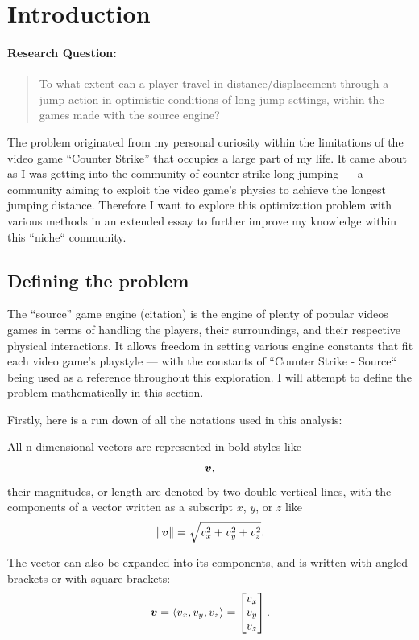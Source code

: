 \section{Introduction}

\paragraph{Research Question:}
\begin{quote}
    To what extent can a player travel in distance/displacement through a jump action in optimistic conditions of long-jump settings, within the games made with the source engine?
\end{quote}

The problem originated from my personal curiosity within the limitations of the video game ``Counter Strike'' that occupies a large part of my life. It came about as I was getting into the community of counter-strike long jumping --- a community aiming to exploit the video game's physics to achieve the longest jumping distance. Therefore I want to explore this optimization problem with various methods in an extended essay to further improve my knowledge within this ``niche`` community.

\subsection{Defining the problem}
The ``source'' game engine (citation) is the engine of plenty of popular videos games in terms of handling the players, their surroundings, and their respective physical interactions. It allows freedom in setting various engine constants that fit each video game's playstyle --- with the constants of ``Counter Strike - Source`` being used as a reference throughout this exploration. I will attempt to define the problem mathematically in this section.

Firstly, here is a run down of all the notations used in this analysis:

All n-dimensional vectors are represented in bold styles like
\[
\boldsymbol{v},
\]
their magnitudes, or length are denoted by two double vertical lines, with the components of a vector written as a subscript $x$, $y$, or $z$ like
\[
\|\boldsymbol{v}\| = \sqrt{v_x^2 + v_y^2 + v_z^2}.
\]

The vector can also be expanded into its components, and is written with angled brackets or with square brackets:
\[
\boldsymbol{v} = \left\langle v_x, v_y, v_z \right\rangle = \begin{bmatrix} v_x\\v_y\\v_z \end{bmatrix}.
\]

